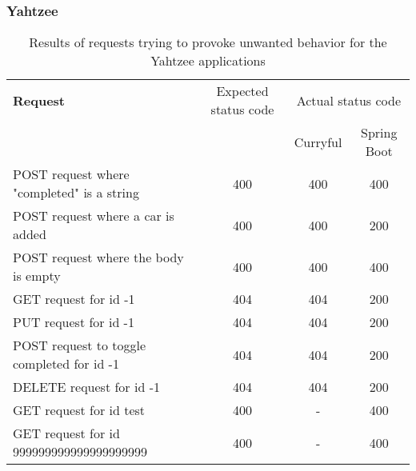 \documentclass[a4paper,titlepage]{article}
\begin{document}
\subsubsection{Yahtzee}
\begin{table}[h!]
	\begin{tabularx}{\textwidth}{|X|c|c|c|}
		\hline
		\textbf{Request}                           & Expected status code & \multicolumn{2}{c|}{Actual status code}               \\
		                                           &                      & Curryful                                & Spring Boot \\
		\hline
		POST request where "completed" is a string & 400                  & 400                                     & 400         \\
		POST request where a car is added          & 400                  & 400                                     & 200         \\
		POST request where the body is empty       & 400                  & 400                                     & 400         \\
		GET request for id -1                      & 404                  & 404                                     & 200         \\
		PUT request for id -1                      & 404                  & 404                                     & 200         \\
		POST request to toggle completed for id -1 & 404                  & 404                                     & 200         \\
		DELETE request for id -1                   & 404                  & 404                                     & 200         \\
		GET request for id test                    & 400                  & -                                       & 400         \\
		GET request for id 999999999999999999999   & 400                  & -                                       & 400         \\
		\hline
	\end{tabularx}
	\caption{
		Results of requests trying to provoke unwanted behavior for the Yahtzee
		applications
	}
\end{table}
\end{document}
